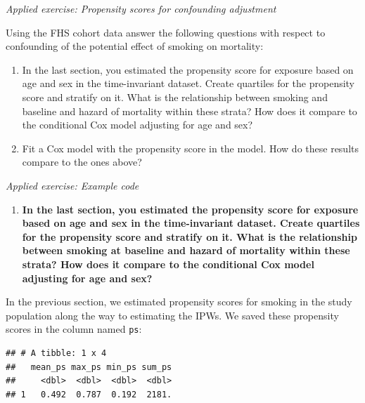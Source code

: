 \documentclass[
]{book}
\newenvironment{Shaded}{\begin{snugshade}}{\end{snugshade}}
\newcommand{\DataTypeTok}[1]{\textcolor[rgb]{0.13,0.29,0.53}{#1}}
\newcommand{\KeywordTok}[1]{\textcolor[rgb]{0.13,0.29,0.53}{\textbf{#1}}}
\newcommand{\NormalTok}[1]{#1}
\newcommand{\OperatorTok}[1]{\textcolor[rgb]{0.81,0.36,0.00}{\textbf{#1}}}
\newcommand{\StringTok}[1]{\textcolor[rgb]{0.31,0.60,0.02}{#1}}
\providecommand{\tightlist}{%
  \setlength{\itemsep}{0pt}\setlength{\parskip}{0pt}}
\begin{document}
\emph{Applied exercise: Propensity scores for confounding adjustment}

Using the FHS cohort data answer the following questions with respect to confounding of the potential effect of smoking on mortality:

\begin{enumerate}
\def\labelenumi{\arabic{enumi}.}
\tightlist
\item
  In the last section, you estimated the propensity score for exposure based on age and sex in the time-invariant dataset. Create quartiles for the propensity score and stratify on it. What is the relationship between smoking and baseline and hazard of mortality within these strata? How does it compare to the conditional Cox model adjusting for age and sex?
\item
  Fit a Cox model with the propensity score in the model. How do these results compare to the ones above?
\end{enumerate}

\emph{Applied exercise: Example code}

\begin{enumerate}
\def\labelenumi{\arabic{enumi}.}
\tightlist
\item
  \textbf{In the last section, you estimated the propensity score for exposure based on age and sex in the time-invariant dataset. Create quartiles for the propensity score and stratify on it. What is the relationship between smoking at baseline and hazard of mortality within these strata? How does it compare to the conditional Cox model adjusting for age and sex?}
\end{enumerate}

In the previous section, we estimated propensity scores for smoking in the study population along the way to estimating the IPWs. We saved these propensity scores in the column named \texttt{ps}:

\begin{Shaded}
\end{Shaded}

\begin{verbatim}
## # A tibble: 1 x 4
##   mean_ps max_ps min_ps sum_ps
##     <dbl>  <dbl>  <dbl>  <dbl>
## 1   0.492  0.787  0.192  2181.
\end{verbatim}
\end{document}
